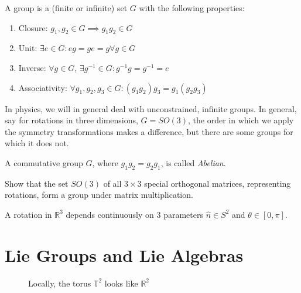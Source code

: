 \begin{definition}[Group]
 A group is a (finite or infinite) set $G$ with the following properties:
\begin{enumerate}
  \item Closure: $g_1, g_2 \in G \implies g_1 g_2 \in G$
  \item Unit: $\exists e \in G: eg = ge = g \forall g \in G$
  \item Inverse: $\forall g \in G$, $\exists g^{-1} \in G : g^{-1}g = g^{-1} = e$
  \item Associativity: $\forall g_1, g_2, g_3 \in G: (g_1 g_2) g_3 = g_1 (g_2 g_3)$
\end{enumerate}
\end{definition} 

In physics, we will in general deal with unconstrained, infinite groups. In general, say for rotations in three dimensions, $G = SO(3)$, the order in which we apply the symmetry transformations makes a difference, but there are some groups for which it does not.

\begin{definition}[Abelian]
A commutative group $G$, where $g_1 g_2 = g_2 g_1$, is called \emph{Abelian}.
\end{definition}

\begin{exercise}
  Show that the set $SO(3)$ of all $3\times 3$ special orthogonal matrices, representing rotations, form a group under matrix multiplication.
\end{exercise}

\begin{remark}
  A rotation in $\mathbb{R}^3$ depends continuously on 3 parameters $\hat n \in S^2$ and $\theta \in [0, \pi]$.
\end{remark}

\section{Lie Groups and Lie Algebras}%
\label{sec:lie_groups_and_lie_algebras}

\begin{figure}[htpb]
  \centering
  \def\svgwidth{0.6\columnwidth}
  
  \caption{Locally, the torus $\mathbb{T}^2$ looks like $\mathbb{R}^{2}$}
  \label{fig:l1f1}
\end{figure}

